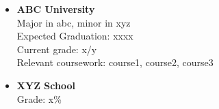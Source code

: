 \begin {itemize}
	\item
		\textbf {ABC University} \\
		Major in abc, minor in xyz \\
		Expected Graduation: xxxx \\
		Current grade: x/y \\
		Relevant coursework: course1, course2, course3

	\item
		\textbf {XYZ School} \\
		Grade: x\%
\end {itemize}

